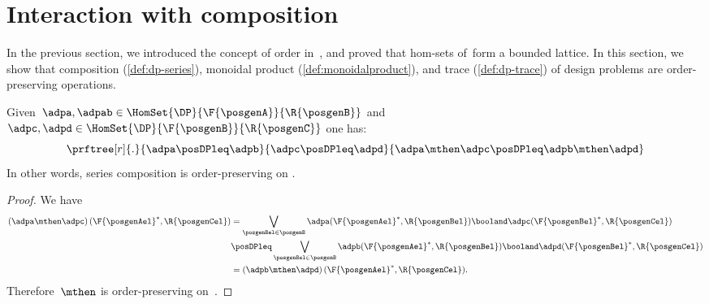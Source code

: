 
\section{Interaction with composition}
In the previous section, we introduced the concept of order in~\DP, and proved that hom-sets of~\DP form a bounded lattice.
In this section, we show that composition (\cref{def:dp-series}), monoidal product (\cref{def:monoidalproduct}), and trace (\cref{def:dp-trace}) of design problems are order-preserving operations.

\begin{lemma}
    \label{lem:series_pres_order}
    Given~$\adpa,\adpab \in \HomSet{\DP}{\F{\posgenA}}{\R{\posgenB}}$ and~$\adpc,\adpd \in \HomSet{\DP}{\F{\posgenB}}{\R{\posgenC}}$ one has:
    \begin{equation}
        \prftree[r]{.}{\adpa\posDPleq \adpb}{\adpc\posDPleq \adpd}{\adpa\mthen \adpc \posDPleq \adpb\mthen \adpd}
    \end{equation}
    In other words, series composition is order-preserving on \DP.
\end{lemma}

\begin{proof}
    We have
    \begin{equation}
        \label{eq:series_pres_ord}
        \begin{aligned}
            \left( \adpa\mthen \adpc\right)(\F{\posgenAel}^*,\R{\posgenCel}) & =                                                                                                                                
            \bigvee_{\posgenBel\in \posgenB}\adpa(\F{\posgenAel}^*,\R{\posgenBel})\booland \adpc(\F{\posgenBel}^*,\R{\posgenCel})                                                                               \\
                                                                             & \posDPleq \bigvee_{\posgenBel\in \posgenB} \adpb(\F{\posgenAel}^*,\R{\posgenBel})\booland \adpd(\F{\posgenBel}^*,\R{\posgenCel}) \\
                                                                             & =\left( \adpb\mthen \adpd\right)(\F{\posgenAel}^*,\R{\posgenCel}).                                                               
        \end{aligned}
    \end{equation}
    Therefore~$\mthen$ is order-preserving on~\DP.
\end{proof}

